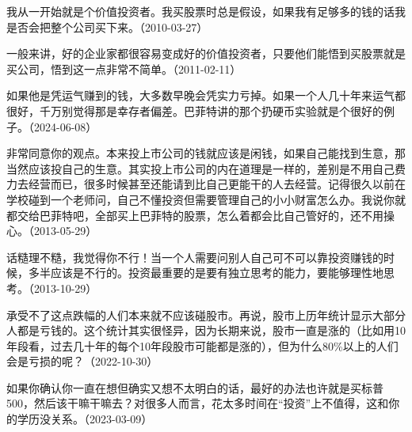 我从一开始就是个价值投资者。我买股票时总是假设，如果我有足够多的钱的话我是否会把整个公司买下来。（2010-03-27）


一般来讲，好的企业家都很容易变成好的价值投资者，只要他们能悟到买股票就是买公司，悟到这一点非常不简单。（2011-02-11）


如果他是凭运气赚到的钱，大多数早晚会凭实力亏掉。如果一个人几十年来运气都很好，千万别觉得那是幸存者偏差。巴菲特讲的那个扔硬币实验就是个很好的例子。（2024-06-08）


非常同意你的观点。本来投上市公司的钱就应该是闲钱，如果自己能找到生意，那当然应该投自己的生意。其实投上市公司的内在道理是一样的，差别是不用自己费力去经营而已，很多时候甚至还能请到比自己更能干的人去经营。记得很久以前在学校碰到一个老师问，自己不懂投资但需要管理自己的小小财富怎么办。我说你就都交给巴菲特吧，全部买上巴菲特的股票，怎么着都会比自己管好的，还不用操心。（2013-05-29）


话糙理不糙，我觉得你不行！当一个人需要问别人自己可不可以靠投资赚钱的时候，多半应该是不行的。投资最重要的是要有独立思考的能力，要能够理性地思考。（2013-10-29）


承受不了这点跌幅的人们本来就不应该碰股市。再说，股市上历年统计显示大部分人都是亏钱的。这个统计其实很怪异，因为长期来说，股市一直是涨的（比如用10年段看，过去几十年的每个10年段股市可能都是涨的），但为什么80\%以上的人们会是亏损的呢？（2022-10-30）


如果你确认你一直在想但确实又想不太明白的话，最好的办法也许就是买标普500，然后该干嘛干嘛去？对很多人而言，花太多时间在“投资”上不值得，这和你的学历没关系。（2023-03-09）

